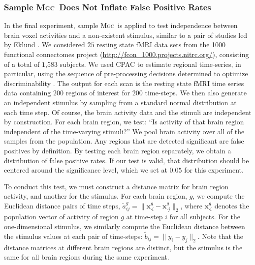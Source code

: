 \documentclass[11pt]{article}
\providecommand{\sct}[1]{{\normalfont\textsc{#1}}}
\providecommand{\mb}[1]{\boldsymbol{#1}}
\newcommand{\Mgc}{\sct{Mgc}}
\begin{document}
\subsubsection*{Sample \Mgc~Does Not Inflate False Positive Rates} %

In the final experiment, sample \Mgc~is applied to test independence between brain voxel activities and a non-existent stimulus, similar to a pair of studies led by Eklund  \cite{EklundKnutsson2012,Eklund2015}. We considered $25$ resting state fMRI data sets from the 1000 functional connectomes project (\url{http://fcon_1000.projects.nitrc.org/}), consisting of a total of $1$,$583$ subjects.
We used CPAC to estimate regional time-series, in particular, using the sequence of pre-processing decisions determined to optimize discriminability \cite{Wang2016}.  The output for each scan is the resting state fMRI time series data containing $200$ regions of interest for $200$ time-steps.
%
%
%
We then also generate an independent stimulus  by sampling from a standard normal distribution at each time step.  Of course, the brain activity data and the stimuli are independent by construction.
For each brain region, we test: ``Is activity of that  brain region independent of the time-varying stimuli?'' We pool brain activity over all of the samples from the population.
Any regions that are detected significant are false positives by definition.  By testing each brain region separately, we obtain a distribution of false positive rates.  If our test is valid, that distribution should be centered around the significance level, which we set at $0.05$ for this experiment.

To conduct this test, we must construct a distance matrix for brain region activity, and another for the stimulus. For each brain region, $g$, we compute the Euclidean distance pairs of time steps,  $\tilde{a}_{ij}^g=\|\mb{x}_{\cdot i}^g-\mb{x}_{\cdot j}^g\|_2$,  where $\mb{x}_{\cdot i}^g$ denotes the population vector of activity of region $g$ at time-step $i$ for all subjects.
For the one-dimensional stimulus, we similarly compute the Euclidean distance between the stimulus values at each pair of time-steps: $\tilde{b}_{ij}= \|y_i - y_j\|_2$.
Note that the distance matrices at different brain regions are distinct, but the stimulus is the same for all brain regions during the same experiment.
\end{document}
